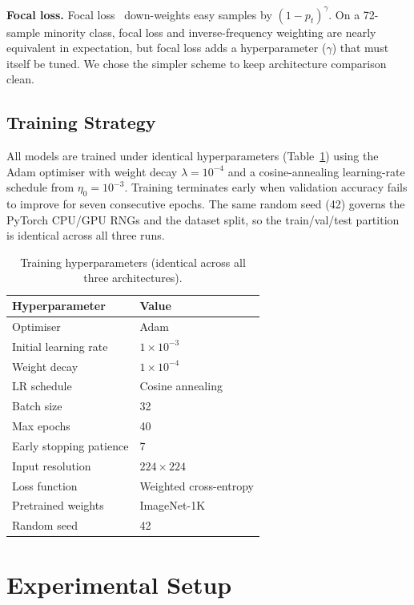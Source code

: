 \documentclass[conference,10pt]{IEEEtran}
\begin{document}
\textbf{Focal loss.} Focal loss~\cite{linfocal2017} down-weights easy
samples by $(1-p_t)^\gamma$. On a 72-sample minority class, focal loss and
inverse-frequency weighting are nearly equivalent in expectation, but focal
loss adds a hyperparameter ($\gamma$) that must itself be tuned. We chose
the simpler scheme to keep architecture comparison clean.

\subsection{Training Strategy}

All models are trained under identical hyperparameters
(Table~\ref{tab:hyperparams}) using the Adam optimiser with weight decay
$\lambda=10^{-4}$ and a cosine-annealing learning-rate schedule from
$\eta_0=10^{-3}$. Training terminates early when validation accuracy fails to
improve for seven consecutive epochs. The same random seed (42) governs the
PyTorch CPU/GPU RNGs and the dataset split, so the train/val/test partition
is identical across all three runs.

\begin{table}[t]
\centering
\caption{Training hyperparameters (identical across all three architectures).}
\label{tab:hyperparams}
\renewcommand{\arraystretch}{1.15}
\begin{tabular}{ll}
\toprule
\textbf{Hyperparameter} & \textbf{Value} \\
\midrule
Optimiser              & Adam \\
Initial learning rate  & $1\times10^{-3}$ \\
Weight decay           & $1\times10^{-4}$ \\
LR schedule            & Cosine annealing \\
Batch size             & 32 \\
Max epochs             & 40 \\
Early stopping patience & 7 \\
Input resolution       & $224\times224$ \\
Loss function          & Weighted cross-entropy \\
Pretrained weights     & ImageNet-1K \\
Random seed            & 42 \\
\bottomrule
\end{tabular}
\end{table}

\section{Experimental Setup}\label{sec:exp}
\end{document}
